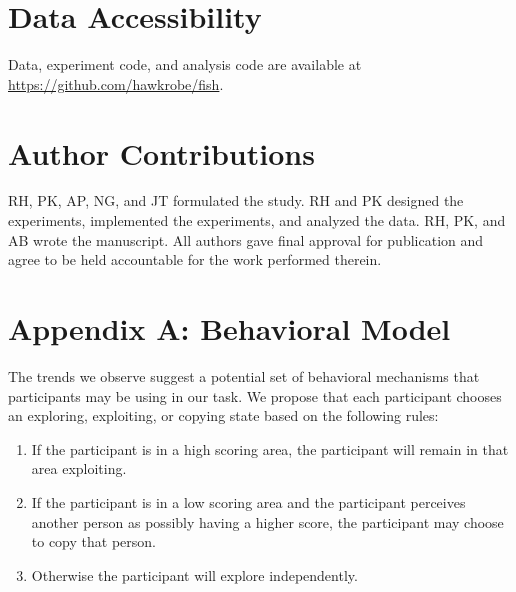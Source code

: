 \documentclass[12pt,letterpaper]{article}
\begin{document}
\section*{Data Accessibility}

\small

Data, experiment code, and analysis code are available at \url{https://github.com/hawkrobe/fish}.

\section*{Author Contributions}

\small

RH, PK, AP, NG, and JT formulated  the study. RH and PK designed the experiments, implemented the experiments, and analyzed the data. RH, PK, and AB wrote the manuscript. All authors gave final approval for publication and agree to be held accountable for the work performed therein.

\section*{Appendix A: Behavioral Model}

The trends we observe suggest a potential set of behavioral mechanisms
that participants may be using in our task.  We propose that each
participant chooses an exploring, exploiting, or copying state based on the following
rules:
\begin{enumerate}
\item
  If the participant is in a high scoring area, the participant will remain in that area
  exploiting.
\item
  If the participant is in a low scoring area and the participant perceives another
  person as possibly having a higher score, the participant may choose to
  copy that person.
\item
  Otherwise the participant will explore independently.
\end{enumerate}
\end{document}
